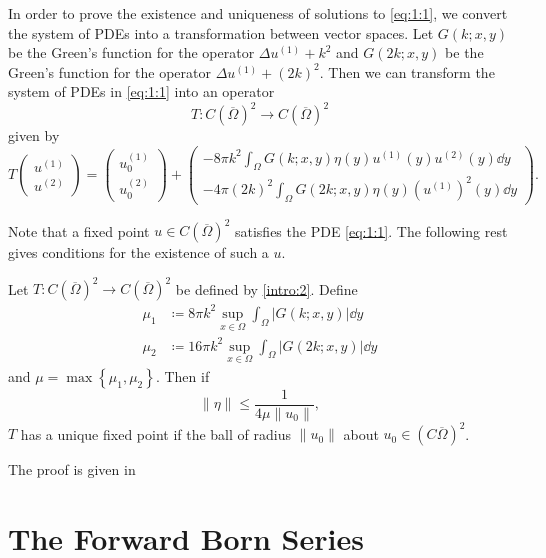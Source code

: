 \documentclass[a4paper, 12pt]{article}
\begin{document}
In order to prove the existence and uniqueness of solutions to \cref{eq:1:1}, we convert the system of PDEs into a transformation between vector spaces.
Let $G\left( k; x, y \right) $ be the Green's function for the operator $\Delta u^{(1)} + k^2$
and
$G\left( 2k; x, y \right) $ be the Green's function for the operator $\Delta u^{(1)} + \left( 2k \right)^2$.
Then we can transform the system of PDEs in \cref{eq:1:1} into an operator
\[
	T\colon C\left( \overline{\Omega} \right)^2\to C\left( \overline{\Omega} \right)^2
\]
given by
\begin{equation}\label{intro:2}
T\begin{pmatrix} u^{(1)}\\u^{(2)} \end{pmatrix}  = \begin{pmatrix} u_0^{(1)}\\u_0^{(2)} \end{pmatrix} +
\begin{pmatrix}
	-8\pi k^2 \int_{\Omega}^{} G\left(k; x,y \right) \eta\left( y \right) u^{(1)}\left( y \right) u^{(2)}\left( y \right)\dd{y}\\
	-4 \pi \left( 2k \right) ^2\int_{\Omega}^{} G\left( 2k; x,y \right) \eta\left( y \right) \left(u^{(1)}\right)^2\left( y \right)\dd{y}
\end{pmatrix}
.\end{equation}

Note that a fixed point $u \in C\left( \overline{\Omega} \right)^2$ satisfies the PDE \cref{eq:1:1}.
The following rest gives conditions for the existence of such a $u$.

\begin{thm}
	Let $T: C\left( \overline{\Omega} \right)^2 \to C\left( \overline{\Omega} \right)^2$ be defined by \cref{intro:2}.
	Define
\begin{align*}
	\mu_1 &\coloneqq 8\pi k^2 \sup_{x \in \Omega}\int_{\Omega}^{} \left| G\left(k; x,y \right) \right|  \dd{y}\\
	\mu_{2}&\coloneqq 16\pi k^2 \sup_{x \in \Omega}\int_{\Omega}^{} \left| G\left(2k; x,y \right) \right|  \dd{y}
\end{align*}
and $\mu = \max \left\{ \mu_1,\mu_2 \right\}$.
Then if
\[
\lVert \eta \rVert \le \frac{1}{4\mu \lVert u_0 \rVert}
,\] 
$T$ has a unique fixed point if the ball of radius $\lVert u_0 \rVert$ about $u_0 \in \left( C \overline{\Omega} \right)^2$.
\end{thm}
The proof is given in 

\section{The Forward Born Series}
\end{document}
